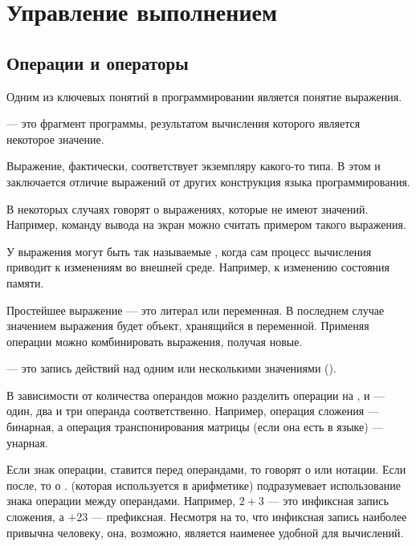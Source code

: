 \chapter{Управление выполнением}

\section{Операции и операторы}


Одним из ключевых понятий в программировании является понятие выражения.

\begin{defn}
   — это фрагмент программы, результатом
  вычисления которого является некоторое значение.
\end{defn}

Выражение, фактически, соответствует экземпляру какого-то типа. В этом
и заключается отличие выражений от других конструкция языка
программирования.

В некоторых случаях говорят о выражениях, которые не имеют
значений. Например, команду вывода на экран можно считать примером
такого выражения.

У выражения могут быть так называемые , когда сам процесс вычисления приводит к изменениям во
внешней среде. Например, к изменению состояния памяти.

Простейшее выражение — это литерал или переменная. В последнем случае
значением выражения будет объект, хранящийся в переменной. Применяя
операции можно комбинировать выражения, получая новые.

\begin{defn}
   — это запись действий над одним или
  несколькими значениями ().
\end{defn}


В зависимости от количества операндов можно разделить операции на
,  и
 — один, два и три операнда
соответственно. Например, операция сложения — бинарная, а операция
транспонирования матрицы (если она есть в языке) — унарная.

Если знак операции, ставится перед операндами, то говорят о
 или нотации. Если после,
то о
.  (которая используется в арифметике) подразумевает
использование знака операции между операндами. Например, $2 + 3$ — это
инфиксная запись сложения, а $+ 2 3$ — префиксная. Несмотря на то, что
инфиксная запись наиболее привычна человеку, она, возможно, является
наименее удобной для вычислений.

